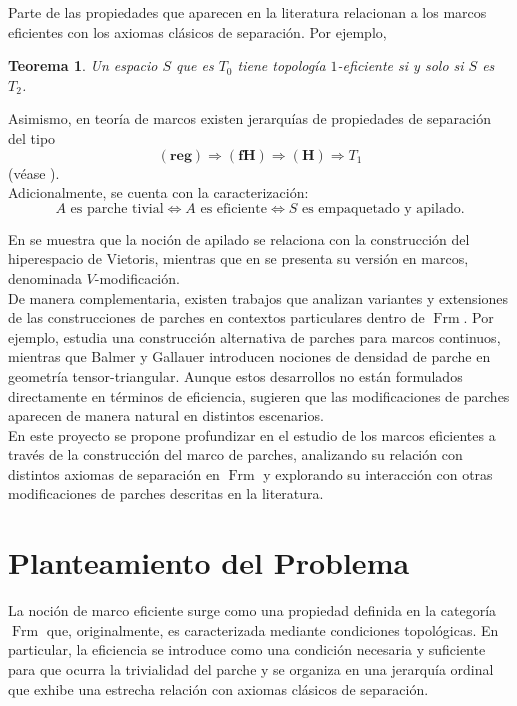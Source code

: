 \documentclass{protocol_template}
\newtheorem{thm}{Teorema}[section]
\DeclareMathOperator{\Frm}{Frm}
\begin{document}
Parte de las propiedades que aparecen en la literatura relacionan a los marcos eficientes con los axiomas clásicos de separación. Por ejemplo,

\begin{thm}\label{Teorema1}
    Un espacio $S$ que es $T_0$ tiene topología $1$-eficiente si y solo si $S$ es $T_2$. 
\end{thm}

Asimismo, en teoría de marcos existen jerarquías de propiedades de separación del tipo
\[
\mathbf{(reg)}\Rightarrow \mathbf{(fH)}\Rightarrow \mathbf{(H)}\Rightarrow T_1
\]
(véase \cite{picado2021separation}). \\

Adicionalmente, se cuenta con la caracterización:
\[
A\text{ es parche tivial}\iff A\text{ es eficiente}\iff S \text{ es empaquetado y apilado}.
\]

En \cite{sexton2006ordinal} se muestra que la noción de apilado se relaciona con la construcción del hiperespacio de Vietoris, mientras que en \cite{simmons2004vietoris} se presenta
su versión en marcos, denominada $V$-modificación.\\

De manera complementaria, existen trabajos que analizan variantes y extensiones de las construcciones de parches en contextos particulares dentro de $\Frm$.
Por ejemplo, \cite{klinke2013yet} estudia una construcción alternativa de parches para marcos continuos, mientras que Balmer y Gallauer \cite{BalmerGallauer2025PatchDensity}
introducen nociones de densidad de parche en geometría tensor-triangular. Aunque estos desarrollos no están formulados directamente en términos de eficiencia,
sugieren que las modificaciones de parches aparecen de manera natural en distintos escenarios.\\

En este proyecto se propone profundizar en el estudio de los marcos eficientes a través de la construcción del marco de parches, analizando su relación con distintos axiomas 
de separación en $\Frm$ y explorando su interacción con otras modificaciones de parches descritas en la literatura.

\section{Planteamiento del Problema}
La noción de marco eficiente surge como una propiedad definida en la categoría $\Frm$ que, originalmente,
es caracterizada mediante condiciones topológicas. En particular, la eficiencia se introduce como una condición necesaria y suficiente 
para que ocurra la trivialidad del parche y se organiza en una jerarquía ordinal que exhibe una estrecha relación con axiomas clásicos 
de separación.\\
\end{document}
